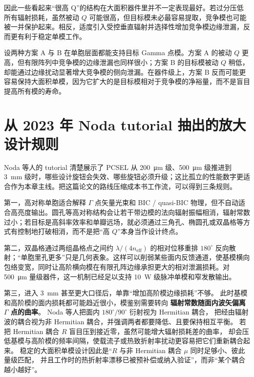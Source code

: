 因此一些看起来“很高 Q”的结构在大面积器件里并不一定表现最好。若过分压低所有辐射损耗，虽然被动 $Q$ 可能很高，但目标模未必最容易提取，竞争模也可能被一并保护起来。相反，适度引入受控垂直辐射并选择性增加竞争模边缘泄漏，反而更有利于稳定单模工作。

\begin{ExampleBox}
设两种方案 A 与 B 在单胞层面都能支持目标 Gamma 点模。方案 A 的被动 $Q$ 更高，但有限阵列中竞争模的边缘泄漏也同样很小；方案 B 的目标模被动 $Q$ 稍低，却能通过边缘扰动显著增大竞争模的侧向泄漏。在器件级上，方案 B 反而可能更容易保持大面积单模，因为它扩大的是目标模相对于竞争模的净裕量，而不是盲目提高所有模的寿命。
\end{ExampleBox}

\section{从 2023 年 Noda tutorial 抽出的放大设计规则}
Noda 等人的 tutorial 清楚展示了 PCSEL 从 \SI{200}{\micro\meter} 级、\SI{500}{\micro\meter} 级推进到 \SI{3}{mm} 级时，哪些设计旋钮会失效、哪些旋钮必须升级；这比孤立的性能数字更适合作为本章主线\cite{noda2023tutorial}。把这篇论文的路线压缩成本书工作流，可以得到三条规则。

第一，高对称单胞适合解释 $\Gamma$ 点矢量光束和 BIC / quasi-BIC 物理，但不自动适合高亮度输出。圆孔等高对称结构会让若干带边模的法向辐射振幅相消，辐射常数过小；若目标是高斜率效率和单瓣远场，就必须通过三角孔、椭圆孔或双晶格等方式有控制地打破相消，而不是把“高 $Q$”本身当作设计终点。

第二，双晶格通过两组晶格点之间约 $\lambda/(4n_{\mathrm{eff}})$ 的相对位移重排 $180^\circ$ 反向散射；“单胞里孔更多”只是几何表象。这样可以削弱某些面内反馈通道，使基模横向包络变宽，同时让高阶横向模在有限孔阵边缘承担更大的相对泄漏损耗。对 \SI{500}{\micro\meter} 量级器件，这一机制已经足以支持 \SI{10}{W} 级脉冲单模和窄发散输出\cite{yoshida2019,noda2023tutorial}。

第三，进入 \SI{3}{mm} 甚至更大口径后，单靠“增加高阶模边缘损耗”不够。
此时基模和高阶模的面内损耗都可能趋近很小，模鉴别需要转向
\textbf{辐射常数随面内波矢偏离 $\Gamma$ 点的曲率}。
Noda 等人把面内 $180^\circ/90^\circ$ 衍射视为 Hermitian 耦合，
把经由辐射波的耦合视为非 Hermitian 耦合，并强调两者都要降低、且要保持相互平衡。
若把 Hermitian 耦合 $R$ 盲目压到接近零，虽然可能增大辐射损耗差的曲率，
却会压低基模与高阶模的频率间隔，使载流子或热致折射率扰动更容易把它们重新耦合起来。
稳定的大面积单模设计因此是“$R$ 与非 Hermitian 耦合 $\mu$ 同时足够小、彼此量级匹配，
并且工作时的热折射率漂移已被预补偿或纳入验证”，而非“某个耦合越小越好”。

